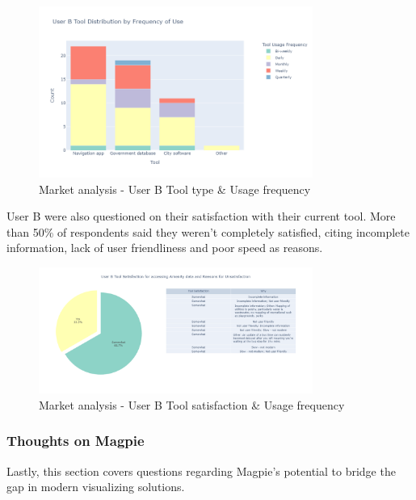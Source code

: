 \documentclass[preview]{standalone}
\begin{document}
\begin{figure}[htbp]
    \centering{}
    \includegraphics[width=0.8\textwidth]{images/mr-userb-tool-freq.png}
    \caption{Market analysis - User B Tool type \& Usage frequency}
\end{figure}

User B were also questioned on their satisfaction with their current tool. More
than 50\% of respondents said they weren't completely satisfied, citing
incomplete information, lack of user friendliness and poor speed as reasons.

\begin{figure}[htbp]
    \centering{}
    \includegraphics[width=0.8\textwidth]{images/mr-userb-tool-satisfaction.png}
    \caption{Market analysis - User B Tool satisfaction \& Usage frequency}
\end{figure}

\subsubsection{Thoughts on Magpie}
Lastly, this section covers questions regarding Magpie's potential to bridge the
gap in modern visualizing solutions.
\end{document}
